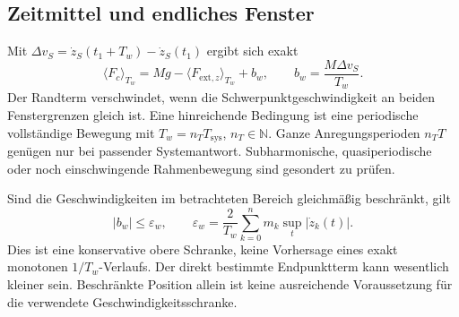 \documentclass[11pt,a4paper]{article}
\begin{document}
\subsection{Zeitmittel und endliches Fenster}
Mit $\Delta v_S=\dot z_S(t_1+T_w)-\dot z_S(t_1)$ ergibt sich exakt
\begin{equation}
\langle F_c\rangle_{T_w}=Mg-\langle F_{\mathrm{ext},z}\rangle_{T_w}+b_w,
\qquad b_w=\frac{M\Delta v_S}{T_w}.
\label{eq:fenster}
\end{equation}
Der Randterm verschwindet, wenn die Schwerpunktgeschwindigkeit an beiden Fenstergrenzen gleich ist. Eine hinreichende Bedingung ist eine periodische vollständige Bewegung mit $T_w=n_T T_{\mathrm{sys}}$, $n_T\in\mathbb N$. Ganze Anregungsperioden $n_TT$ genügen nur bei passender Systemantwort. Subharmonische, quasiperiodische oder noch einschwingende Rahmenbewegung sind gesondert zu prüfen.

Sind die Geschwindigkeiten im betrachteten Bereich gleichmäßig beschränkt, gilt
\begin{equation}
|b_w|\le\varepsilon_w,\qquad
\varepsilon_w=\frac{2}{T_w}\sum_{k=0}^{n}m_k\sup_t|\dot z_k(t)|.
\label{eq:bound}
\end{equation}
Dies ist eine konservative obere Schranke, keine Vorhersage eines exakt monotonen $1/T_w$-Verlaufs. Der direkt bestimmte Endpunktterm kann wesentlich kleiner sein. Beschränkte Position allein ist keine ausreichende Voraussetzung für die verwendete Geschwindigkeitsschranke.
\end{document}
